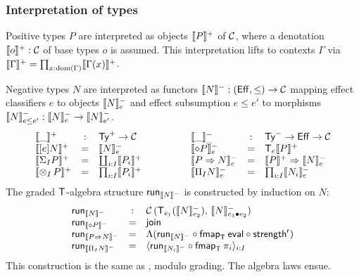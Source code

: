 \documentclass[acmsmall,review,anonymous]{acmart}\settopmatter{printfolios=true,printccs=false,printacmref=false}
\begin{document}
\subsubsection{Interpretation of types}

Positive types $P$ are interpreted as objects $\denp P$ of $\CC$,
where a denotation $\denp o : \CC$ of base types $o$ is assumed.
This interpretation lifts to contexts $\Gamma$ via $\denp \Gamma =
\prod_{x:\dom(\Gamma)} \denp{\Gamma(x)}$.

Negative types $N$ are interpreted
as functors $\denn N : (\Eff,\leq) \to \CC$ mapping
effect classifiers $e$ to objects $\Denn N e$ and effect subsumption $e
\leq e'$ to morphisms $\Denn N {e \leq e'} : \Denn N e \to \Denn N {e'}$.
\[
\begin{array}{lcl}
  \denp\_ & : & \PTy \to \CC \\
  \denp{\thunkty e N} & = & \Denn N e \\
  \denp{\sumt I P} & = & \coprod_{i:I} \denp{P_i} \\
  \denp{\tupt I P} & = & \prod_{i:I} \denp{P_i} \\
\end{array}
\qquad\qquad
\begin{array}{lcl}
  \Denn\_\_ & : & \NTy \to \Eff \to \CC \\
  \Denn{\diamond P} e & = & \T[e] \denp P \\
  \Denn{P \To N}   e & = & \denp P \To \Denn N e \\
  \Denn{\rect I N} e & = & \prod_{i:I} \Denn{N_i}e \\
\end{array}
\]
The graded $\T$-algebra structure $\run[\denn N]$ is constructed by
induction on $N$:
\[
\begin{array}{lcl}
  \run[\denn N] & : & \Hom {\T[e_1](\Denn N {e_2})} {\Denn N {e_1 \bu e_2}} \\
  \run[\denn {\diamond P}] & = & \tjoin \\
  \run[\denn {P \To N}]   & = & \Lambda(\run[\denn N] \circ
                                \fmap[\T]\teval \circ \strengthr) \\
  \run[\denn {\rect I N}] & = & \langle \run[\denn{N_i}] \comp
                                \fmap[\T]{\pi_i} \rangle_{i:I} \\
\end{array}
\]
This construction is the same as \citet{levy:hosc06}, modulo grading.
The algebra laws ensue.
\end{document}
